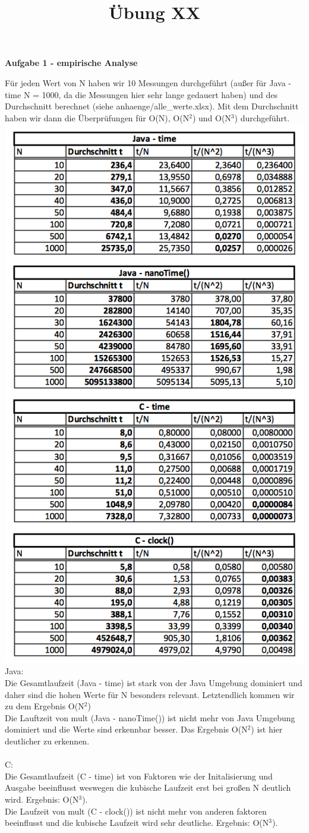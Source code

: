 \documentclass[a4paper,11pt]{scrartcl}
\title{Übung XX}
\begin{document}
\begin{center}
\LARGE{\textbf{Aufgabe 1 - empirische Analyse}}
\end{center}
Für jeden Wert von N haben wir 10 Messungen durchgeführt (außer für Java - time N = 1000, da die Messungen hier sehr lange gedauert haben) und des Durchschnitt berechnet (siehe anhaenge/alle\_werte.xlsx). Mit dem Durchschnitt haben wir dann die Überprüfungen für O(N), O(N$^2$) und O(N$^3$) durchgeführt. 
\includegraphics[width=.51\textwidth]{empirischer_test.png}\\
Java:\\
Die Gesamtlaufzeit (Java - time) ist stark von der Java Umgebung dominiert und daher sind die hohen Werte für N besonders relevant. Letztendlich kommen wir zu dem Ergebnis O(N$^2$)\\
Die Lauftzeit von mult (Java - nanoTime()) ist nicht mehr von Java Umgebung dominiert und die Werte sind erkennbar besser. Das Ergebnis O(N$^2$) ist hier deutlicher zu erkennen.\\\\
C:\\
Die Gesamtlaufzeit (C - time) ist von Faktoren wie der Initalisierung und Ausgabe beeinflusst weswegen die kubische Laufzeit erst bei großen N deutlich wird. Ergebnis: O(N$^3$).\\
Die Laufzeit von mult (C - clock()) ist nicht mehr von anderen faktoren beeinflusst und die kubische Laufzeit wird sehr deutliche. Ergebnis: O(N$^3$).
\end{document}
